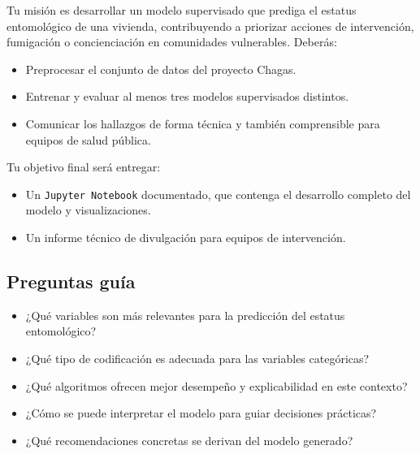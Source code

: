 \documentclass[a4,11pt]{aleph-notas}
\begin{document}
Tu misión es desarrollar un modelo supervisado que prediga el estatus entomológico de una vivienda, contribuyendo a priorizar acciones de intervención, fumigación o concienciación en comunidades vulnerables. Deberás:

\begin{itemize}[leftmargin=*]
    \item Preprocesar el conjunto de datos del proyecto Chagas.
    \item Entrenar y evaluar al menos tres modelos supervisados distintos.
    \item Comunicar los hallazgos de forma técnica y también comprensible para equipos de salud pública.
\end{itemize}

Tu objetivo final será entregar:
\begin{itemize}[leftmargin=*]
    \item Un \texttt{Jupyter Notebook} documentado, que contenga el desarrollo completo del modelo y visualizaciones.
    \item Un informe técnico de divulgación para equipos de intervención.
\end{itemize}

\subsection*{Preguntas guía}
\begin{itemize}[leftmargin=*]
    \item ¿Qué variables son más relevantes para la predicción del estatus entomológico?
    \item ¿Qué tipo de codificación es adecuada para las variables categóricas?
    \item ¿Qué algoritmos ofrecen mejor desempeño y explicabilidad en este contexto?
    \item ¿Cómo se puede interpretar el modelo para guiar decisiones prácticas?
    \item ¿Qué recomendaciones concretas se derivan del modelo generado?
\end{itemize}
\end{document}
